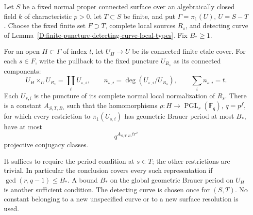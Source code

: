 \begin{theorem}
\label{D:global-finite-puncture-hereditary-bounded-local-period}
Let \(S\) be a fixed normal proper connected surface
over an algebraically closed field \(k\) of characteristic
\(p>0\), let \(T\subset S\) be finite, and put
\(\Gamma=\pi_1(U)\), \(U=S-T\).
Choose the fixed finite set \(F\supset T\), complete
local sources \(R_s\), and detecting curve of
Lemma~\ref{D:finite-puncture-detecting-curve-local-types}.
Fix \(B_*\ge1\).

For an open \(H\subset\Gamma\) of index \(t\), let
\(U_H\to U\) be its connected finite etale cover.
For each \(s\in F\), write the pullback to the fixed
puncture \(U_{R_s}\) as its connected components:
\[
 U_H\times_U U_{R_s}=\coprod_i U_{s,i},
 \qquad n_{s,i}=\deg(U_{s,i}/U_{R_s}),\qquad
                       \sum_i n_{s,i}=t.               \tag{D.GH.13}
\]
Each \(U_{s,i}\) is the puncture of its complete
normal local normalization of \(R_s\).
There is a constant \(A_{S,T,B_*}\) such that the
homomorphisms
\(\rho:H\to\operatorname{PGL}_r(\mathbb F_q)\),
\(q=p^f\), for which every restriction to
\(\pi_1(U_{s,i})\) has geometric Brauer period at most
\(B_*\), have at most
\[
                       q^{A_{S,T,B_*}t r^2}             \tag{D.GH.14}
\]
projective conjugacy classes.

It suffices to require the period condition at
\(s\in T\); the other restrictions are trivial.
In particular the conclusion covers every such
representation if \(\gcd(r,q-1)\le B_*\).
A bound \(B_*\) on the global geometric Brauer
period on \(U_H\) is another sufficient condition.
The detecting curve is chosen once for \((S,T)\).
No constant belonging to a new unspecified curve
or to a new surface resolution is used.
\end{theorem}

